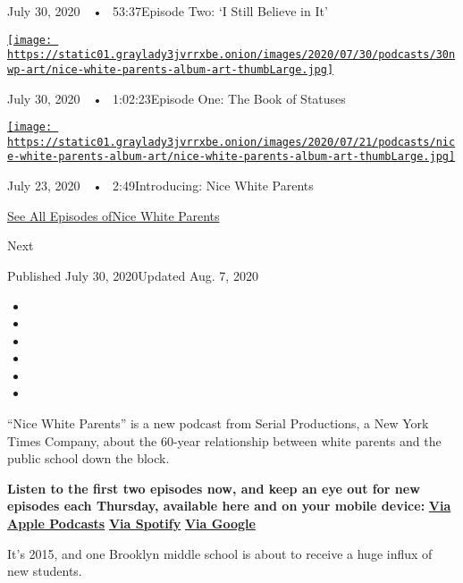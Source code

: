 July 30, 2020~~•~ 53:37Episode Two: `I Still Believe in It'

\href{https://www.nytimes3xbfgragh.onion/2020/07/30/podcasts/nice-white-parents-serial.html?action=click\&module=audio-series-bar\&region=header\&pgtype=Article}{\texttt{[image: https://static01.graylady3jvrrxbe.onion/images/2020/07/30/podcasts/30nwp-art/nice-white-parents-album-art-thumbLarge.jpg]}}

July 30, 2020~~•~ 1:02:23Episode One: The Book of Statuses

\href{https://www.nytimes3xbfgragh.onion/2020/07/23/podcasts/nice-white-parents-serial.html?action=click\&module=audio-series-bar\&region=header\&pgtype=Article}{\texttt{[image: https://static01.graylady3jvrrxbe.onion/images/2020/07/21/podcasts/nice-white-parents-album-art/nice-white-parents-album-art-thumbLarge.jpg]}}

July 23, 2020~~•~ 2:49Introducing: Nice White Parents

\href{https://www.nytimes3xbfgragh.onion/column/nice-white-parents}{See
All Episodes ofNice White Parents}

Next

Published July 30, 2020Updated Aug. 7, 2020

\begin{itemize}
\item
\item
\item
\item
\item
\item
\end{itemize}

``Nice White Parents'' is a new podcast from Serial Productions, a New
York Times Company, about the 60-year relationship between white parents
and the public school down the block.

\textbf{Listen to the first two episodes now, and keep an eye out for
new episodes each Thursday, available here and on your mobile device:}
\textbf{\href{https://podcasts.apple.com/us/podcast/nice-white-parents/id1524080195}{Via
Apple Podcasts}} \textbf{\textbar{}}
\textbf{\href{https://open.spotify.com/show/7oBSLCZFCgpdCaBjIG8mLV?si=YcEPLD3xT2ejXmpQz-tRpw}{Via
Spotify}} \textbf{\textbar{}}
\textbf{\href{https://podcasts.google.com/feed/aHR0cHM6Ly9yc3MuYXJ0MTkuY29tL25pY2Utd2hpdGUtcGFyZW50cw}{Via
Google}}

It's 2015, and one Brooklyn middle school is about to receive a huge
influx of new students.

